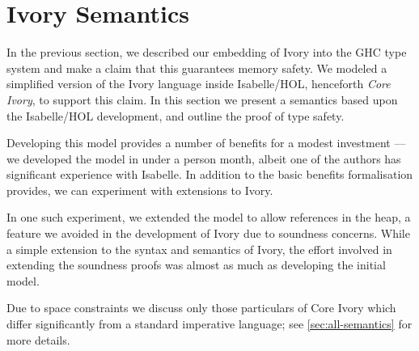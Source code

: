 \newcommand{\coreivory}{Core Ivory}

\section{Ivory Semantics}
\label{sec:semantics}

In the previous section, we described our embedding of Ivory into the
GHC type system and make a claim that this guarantees memory safety.
We modeled a simplified version of the Ivory language inside
Isabelle/HOL\cite{}, henceforth \emph{\coreivory{}}, to support
this claim.  In this section we present a semantics based upon the
Isabelle/HOL development, and outline the proof of type safety.

Developing this model provides a number of benefits for a modest
investment --- we developed the model in under a person month, albeit
one of the authors has significant experience with Isabelle.  In
addition to the basic benefits formalisation provides, we can
experiment with extensions to Ivory.

In one such experiment, we extended the model to allow references in
the heap, a feature we avoided in the development of Ivory due to
soundness concerns.  While a simple extension to the syntax and
semantics of Ivory, the effort involved in extending the soundness
proofs was almost as much as developing the initial model.  

Due to space constraints we discuss only those particulars of
\coreivory{} which differ significantly from a standard imperative
language; see \autoref{sec:all-semantics} for more details.

\newcommand{\sep}{\ |\ }

